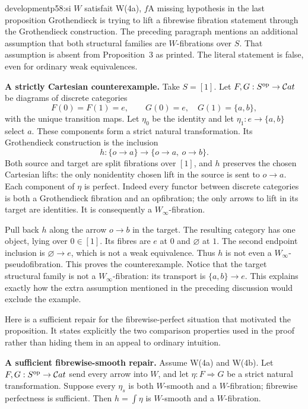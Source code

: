 \begin{dcomment}{development}{p58:si $W$ satisfait W(4a), $f$}{A missing hypothesis in the last proposition}
Grothendieck is trying to lift a fibrewise fibration statement through the Grothendieck construction. The preceding paragraph mentions an additional assumption that both structural families are $W$-fibrations over $S$. That assumption is absent from Proposition~3 as printed. The literal statement is false, even for ordinary weak equivalences.

\textbf{A strictly Cartesian counterexample.}\ours\quad
Take $S=[1]$. Let $F,G:S^{\mathrm{op}}\to\mathcal{C}at$ be diagrams of discrete categories
\[
 F(0)=F(1)=e,\qquad
 G(0)=e,\quad G(1)=\{a,b\},
\]
with the unique transition maps. Let $\eta_0$ be the identity and let $\eta_1:e\to\{a,b\}$ select $a$. These components form a strict natural transformation. Its Grothendieck construction is the inclusion
\[
 h:\{o\to a\}\longrightarrow\{o\to a,\ o\to b\}.
\]
Both source and target are split fibrations over $[1]$, and $h$ preserves the chosen Cartesian lifts: the only nonidentity chosen lift in the source is sent to $o\to a$. Each component of $\eta$ is perfect. Indeed every functor between discrete categories is both a Grothendieck fibration and an opfibration; the only arrows to lift in its target are identities. It is consequently a $W_\infty$-fibration.

Pull back $h$ along the arrow $o\to b$ in the target. The resulting category has one object, lying over $0\in[1]$. Its fibres are $e$ at $0$ and $\varnothing$ at $1$. The second endpoint inclusion is $\varnothing\to e$, which is not a weak equivalence. Thus $h$ is not even a $W_\infty$-pseudofibration. This proves the counterexample. Notice that the target structural family is not a $W_\infty$-fibration: its transport is $\{a,b\}\to e$. This explains exactly how the extra assumption mentioned in the preceding discussion would exclude the example.

Here is a sufficient repair for the fibrewise-perfect situation that motivated the proposition. It states explicitly the two comparison properties used in the proof rather than hiding them in an appeal to ordinary intuition.

\textbf{A sufficient fibrewise-smooth repair.}\ours\quad
Assume W(4a) and W(4b). Let $F,G:S^{\mathrm{op}}\to\mathcal{C}at$ send every arrow into $W$, and let $\eta:F\Rightarrow G$ be a strict natural transformation. Suppose every $\eta_s$ is both $W$-smooth and a $W$-fibration; fibrewise perfectness is sufficient. Then $h=\int\eta$ is $W$-smooth and a $W$-fibration.


\end{dcomment}
